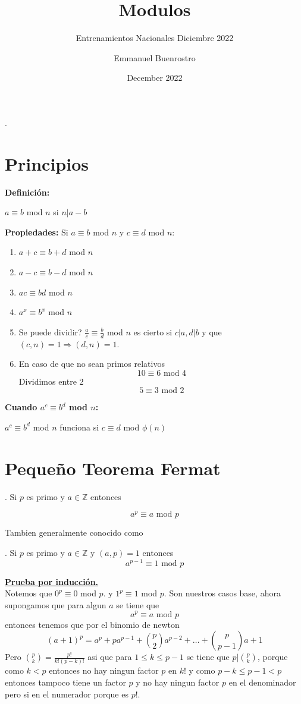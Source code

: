 \documentclass[11pt]{scrartcl}
\title{Modulos}
\subtitle{Entrenamientos Nacionales Diciembre 2022}
\author{Emmanuel Buenrostro}
\date{December 2022}
\begin{document}
\maketitle.


\section{Principios}
\textbf{Definición:} \\
\begin{center}
$a \equiv b$ mod $n$ si $n|a-b$ 
\end{center}
\textbf{ Propiedades:}
Si $a\equiv b$ mod $n$ y $c \equiv d$ mod $n$:
\begin{enumerate}
\item $a+c\equiv b+d$ mod $n$
\item $a-c \equiv b-d$ mod $n$
\item $ac \equiv bd$ mod $n$
\item $a^x\equiv b^x$ mod $n$
\item Se puede dividir? $\frac a c \equiv \frac b d$ mod $n$ es cierto si  $c | a, d|b$ y que $(c,n)=1 \Rightarrow (d,n)=1$.
\item  En caso de que no sean primos relativos 
    $$10 \equiv 6 \text{ mod } 4$$
    Dividimos entre 2
    $$5 \equiv 3 \text{ mod } 2$$
\end{enumerate}
\textbf{Cuando $a^c\equiv b^d$ mod $n$:} \\
\begin{center}
$a^c\equiv b^d$ mod $n$ funciona si $c\equiv d$ mod $\phi (n)$
\end{center}
\section{Pequeño Teorema Fermat}


\begin{theorem}.
 Si $p$ es primo y $a\in \mathbb{Z}$ entonces 

$$a^p \equiv a \text{ mod } p$$
\end{theorem}
Tambien generalmente conocido como 

\begin{theorem}.
 Si $p$ es primo y $a\in \mathbb{Z}$ y $(a,p)=1$ entonces 
$$a^{p-1} \equiv 1 \text{ mod } p$$
\end{theorem}

\underline{\textbf{Prueba por inducción.}} \\
Notemos que $0^p\equiv 0$ mod $p$. y $1^p\equiv 1$ mod $p$. Son nuestros casos base, ahora supongamos que para algun $a$ se tiene que 
$$a^p\equiv a \text{ mod } p$$
entonces tenemos que por el binomio de newton
$$(a+1)^p=a^p+pa^{p-1}+\binom{p}{2}a^{p-2}+\ldots+\binom{p}{p-1}a+1$$
Pero $\binom{p}{k}=\frac{p!}{k!(p-k)!}$ asi que para $1\leq k \leq p-1$ se tiene que $p | \binom{p}{k}$, porque como $k<p$ entonces no hay ningun factor $p$ en $k!$ y como $p-k\leq p-1<p$ entonces tampoco tiene un factor $p$ y no hay ningun factor $p$ en el denominador pero si en el numerador porque es $p!$.
\end{document}

